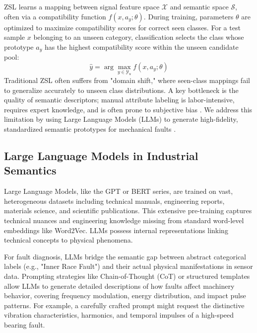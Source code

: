 ZSL learns a mapping between signal feature space $\mathcal{X}$ and semantic space $\mathcal{S}$, often via a compatibility function $f(x, a_y; \theta)$. During training, parameters $\theta$ are optimized to maximize compatibility scores for correct seen classes. For a test sample $x$ belonging to an unseen category, classification selects the class whose prototype $a_y$ has the highest compatibility score within the unseen candidate pool:
\begin{equation}
\hat{y} = \arg\max_{y \in \mathcal{Y}_u} f(x, a_y; \theta)
\end{equation}
Traditional ZSL often suffers from "domain shift," where seen-class mappings fail to generalize accurately to unseen class distributions. A key bottleneck is the quality of semantic descriptors; manual attribute labeling is labor-intensive, requires expert knowledge, and is often prone to subjective bias \cite{palatucci2009zero, lampert2009learning}. We address this limitation by using Large Language Models (LLMs) to generate high-fidelity, standardized semantic prototypes for mechanical faults \cite{xian2018zero}.

\subsection{Large Language Models in Industrial Semantics}
Large Language Models, like the GPT or BERT series, are trained on vast, heterogeneous datasets including technical manuals, engineering reports, materials science, and scientific publications. This extensive pre-training captures technical nuances and engineering knowledge missing from standard word-level embeddings like Word2Vec. LLMs possess internal representations linking technical concepts to physical phenomena.

For fault diagnosis, LLMs bridge the semantic gap between abstract categorical labels (e.g., "Inner Race Fault") and their actual physical manifestations in sensor data. Prompting strategies like Chain-of-Thought (CoT) or structured templates allow LLMs to generate detailed descriptions of how faults affect machinery behavior, covering frequency modulation, energy distribution, and impact pulse patterns. For example, a carefully crafted prompt might request the distinctive vibration characteristics, harmonics, and temporal impulses of a high-speed bearing fault.

